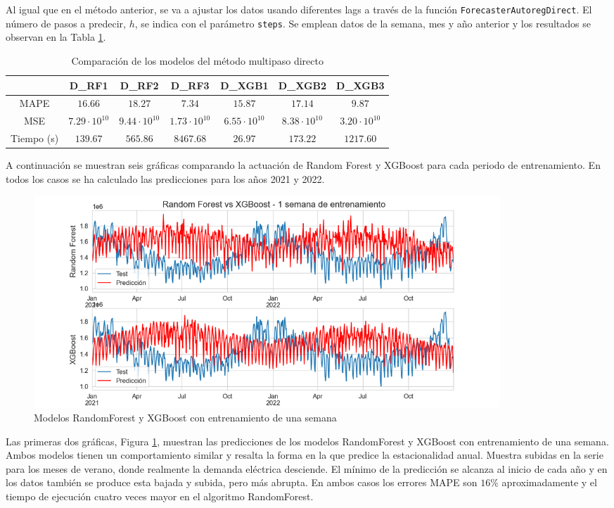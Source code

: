 \documentclass[12pt,twoside]{article}
\begin{document}
Al igual que en el método anterior, se va a ajustar los datos usando diferentes lags a través de la función \texttt{ForecasterAutoregDirect}. El número de pasos a predecir, $h$, se indica con el parámetro \texttt{steps}. Se emplean datos de la semana, mes y año anterior y los resultados se observan en la Tabla \ref{tab:comp_direct}.

\begin{table}[h]
    \centering
\begin{tabular}{ccccccc} \hline
& D\_RF1 & D\_RF2 & D\_RF3 & D\_XGB1 & D\_XGB2 & D\_XGB3 \\ \hline
MAPE   & $16.66$ &  $18.27$ & $7.34$ & $15.87$ & $17.14$ & $9.87$  \\ 
MSE    & $7.29\cdot10^{10}$ &  $9.44\cdot10^{10}$ & $1.73 \cdot10^{10}$ & $6.55\cdot10^{10}$ & $8.38\cdot10^{10}$ & $3.20\cdot10^{10}$ \\
Tiempo (s) & $139.67$  & $565.86$ & $8467.68$ & $26.97$ & $173.22$ & $1217.60$ \\ \hline
\end{tabular}
    \caption{Comparación de los modelos del método multipaso directo}
    \label{tab:comp_direct}
\end{table}

A continuación se muestran seis gráficas comparando la actuación de Random Forest y XGBoost para cada periodo de entrenamiento. En todos los casos se ha calculado las predicciones para los años 2021 y 2022.

\begin{figure}[h]
\centering
    \includegraphics[width = 0.85\textwidth]{imagenes/autoreg_direct3.png}
    \caption{Modelos RandomForest y XGBoost con entrenamiento de una semana}\label{fig:autoreg_direct3}
\end{figure}

Las primeras dos gráficas, Figura \ref{fig:autoreg_direct3}, muestran las predicciones de los modelos RandomForest y XGBoost con entrenamiento de una semana. Ambos modelos tienen un comportamiento similar y resalta la forma en la que predice la estacionalidad anual. Muestra subidas en la serie para los meses de verano, donde realmente la demanda eléctrica desciende. El mínimo de la predicción se alcanza al inicio de cada año y en los datos también se produce esta bajada y subida, pero más abrupta. En ambos casos los errores MAPE son $16\%$ aproximadamente y el tiempo de ejecución cuatro veces mayor en el algoritmo RandomForest.
\end{document}
